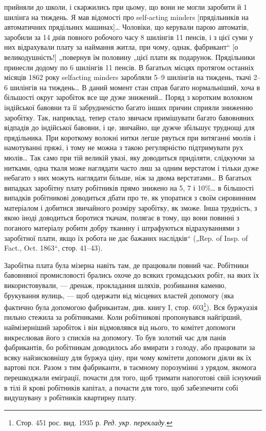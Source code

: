 \parcont{}  %
прийняли до школи, і скаржились при цьому, що вони не могли
заробити й 1 шилінга на тиждень. Я мав відомості про self-acting
minders [прядільників на автоматичних прядільних машинах]\dots{}
Чоловіки, що керували парою автоматів, заробили за 14 днів
повного робочого часу 8 шилінгів 11 пенсів, і з цієї суми у них відрахували
плату за наймання житла, при чому, однак, фабрикант“
[о великодушність!] „повернув їм половину „цієї плати як
подарунок. Прядільники принесли додому по 6 шилінгів 11 пенсів.
В багатьох місцях протягом останніх місяців 1862 року selfacting
minders заробляли 5--9 шилінгів на тиждень, ткачі 2--6 шилінгів
на тиждень\dots{} В даний момент стан справ багато нормальніший,
хоча в більшості округ заробіток все ще дуже знижений\dots{}
Поряд з коротким волокном індійської бавовни та її забрудненістю
багато інших причин сприяли зниженню заробітку. Так,
наприклад, тепер стало звичаєм примішувати багато бавовняних
відпадів до індійської бавовни, і це, звичайно, ще дужче збільшує
труднощі для прядільника. При короткому волокні нитки
легше рвуться при витяганні мюлів і намотуванні пряжі, і тому
не можна з такою регулярністю підтримувати рух мюлів\dots{} Так
само при тій великій увазі, яку доводиться приділяти, слідкуючи
за нитками, одна ткаля може наглядати часто лиш за одним верстатом
і тільки дуже небагато з них можуть наглядати більше,
ніж за двома верстатами\dots{} В багатьох випадках заробітну плату
робітників прямо знижено на 5, 7 і 10\%\dots{} в більшості випадків
робітникові доводиться дбати про те, як упоратися з своїм сировинним
матеріалом і добитися звичайного розміру заробітку, як
зможе. Інша трудність, з якою іноді доводиться боротися ткачам,
полягає в тому, що вони повинні з поганого матеріалу робити
добру тканину і штрафуються відрахуваннями з заробітної
плати, якщо їх робота не дає бажаних наслідків“ („Rep. of Insp.
of Fact., Oct. 1863“, стор. 41--43).

Заробітна плата була мізерна навіть там, де працювали повний
час. Робітники бавовняної промисловості брались охоче до всяких
громадських робіт, на яких їх використовували, — дренаж, прокладання
шляхів, розбивання каменю, брукування вулиць, — щоб
одержати від місцевих властей допомогу (яка фактично була допомогою
фабрикантам, див. книгу I, стор. 603\footnote*{Стор. 451 рос. вид. 1935 р. \emph{Ред. укр. перекладу.}}). Вся буржуазія
пильно стежила за робітниками. Коли робітникові пропонувався
найгірший, наймізерніший заробіток і він відмовлявся від нього,
то комітет допомоги викреслював його з списків на допомогу. То
був золотий час для панів фабрикантів, бо робітникам доводилось
або вмирати з голоду, або працювати за всяку найзисковнішу
для буржуа ціну, при чому комітети допомоги діяли як
їх вартові пси. Разом з тим фабриканти, в таємному порозумінні
з урядом, якомога перешкоджали еміграції, почасти для
того, щоб тримати напоготові свій існуючий в тілі й крові робітників
капітал, а почасти для того, щоб забезпечити собі видушувану
з робітників квартирну плату.

